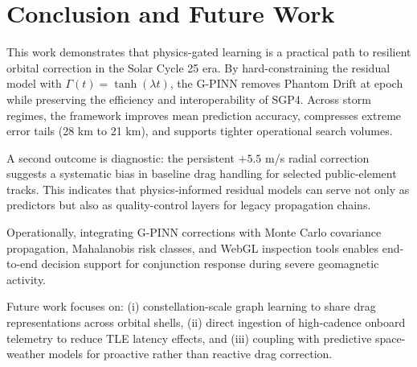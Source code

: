 \section{Conclusion and Future Work}\label{sec:conclusion}

This work demonstrates that physics-gated learning is a practical path to resilient orbital correction in the Solar Cycle 25 era. By hard-constraining the residual model with $\Gamma(t)=\tanh(\lambda t)$, the G-PINN removes Phantom Drift at epoch while preserving the efficiency and interoperability of SGP4. Across storm regimes, the framework improves mean prediction accuracy, compresses extreme error tails (28 km to 21 km), and supports tighter operational search volumes.

A second outcome is diagnostic: the persistent $+5.5$ m/s radial correction suggests a systematic bias in baseline drag handling for selected public-element tracks. This indicates that physics-informed residual models can serve not only as predictors but also as quality-control layers for legacy propagation chains.

Operationally, integrating G-PINN corrections with Monte Carlo covariance propagation, Mahalanobis risk classes, and WebGL inspection tools enables end-to-end decision support for conjunction response during severe geomagnetic activity.

Future work focuses on: (i) constellation-scale graph learning to share drag representations across orbital shells, (ii) direct ingestion of high-cadence onboard telemetry to reduce TLE latency effects, and (iii) coupling with predictive space-weather models for proactive rather than reactive drag correction.